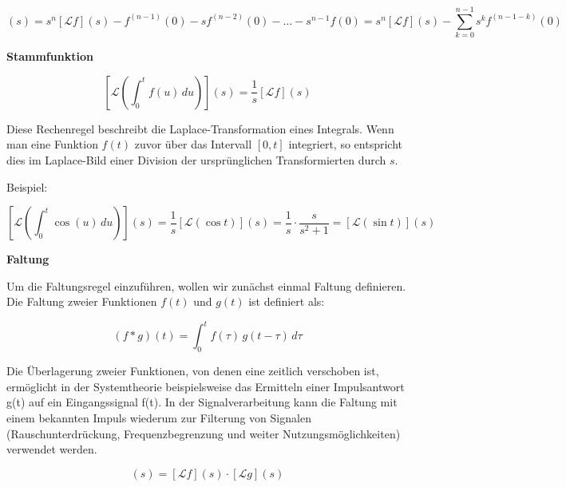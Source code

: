 \begin{equation}
[\mathcal{L}(f^{(n)})](s)
= s^n [\mathcal{L}f](s) - f^{(n-1)}(0) - s f^{(n-2)}(0) - \dots - s^{n-1} f(0)
= s^n [\mathcal{L}f](s) - \sum_{k=0}^{n-1} s^k f^{(n-1-k)}(0)
\label{eq:laplace_hoehere_ableitung}
\end{equation}
\cite[S.~884]{buch1}

\addvspace{1cm}
\textbf{Stammfunktion}

\begin{equation}
\left[ \mathcal{L} \left( \int_0^t f(u) \, du \right) \right](s)
= \frac{1}{s} [\mathcal{L}f](s)
\label{eq:laplace_integralregel}
\end{equation}

Diese Rechenregel beschreibt die Laplace-Transformation eines Integrals. Wenn man eine Funktion $f(t)$ zuvor über das Intervall $[0, t]$ integriert, so entspricht dies im Laplace-Bild einer Division der ursprünglichen Transformierten durch $s$.


Beispiel:

\begin{equation}
\left[ \mathcal{L} \left( \int_0^t \cos(u) \, du \right) \right](s)
= \frac{1}{s} [\mathcal{L}(\cos t)](s)
= \frac{1}{s} \cdot \frac{s}{s^2 + 1}
= [\mathcal{L}(\sin t)](s)
\label{eq:laplace_integral_beispiel}
\end{equation}
\cite[S.~885]{buch1}

\addvspace{1cm}
\textbf{Faltung}

Um die Faltungsregel einzuführen, wollen wir zunächst einmal Faltung definieren. Die Faltung zweier Funktionen \( f(t) \) und \( g(t) \) ist definiert als:

\begin{equation}
(f * g)(t) = \int_{0}^{t} f(\tau) \, g(t - \tau) \, d\tau
\end{equation}

Die Überlagerung zweier Funktionen, von denen eine zeitlich verschoben ist, ermöglicht in der Systemtheorie beispielsweise das Ermitteln einer Impulsantwort g(t) auf ein Eingangssignal f(t). In der Signalverarbeitung kann die Faltung mit einem bekannten Impuls wiederum zur Filterung von Signalen (Rauschunterdrückung, Frequenzbegrenzung und weiter Nutzungsmöglichkeiten) verwendet werden.


\begin{equation}
    [\mathcal{L}(f * g)](s) = [\mathcal{L}f](s) \cdot [\mathcal{L}g](s)
    \label{eq:laplace_faltung}
    \end{equation}
    
